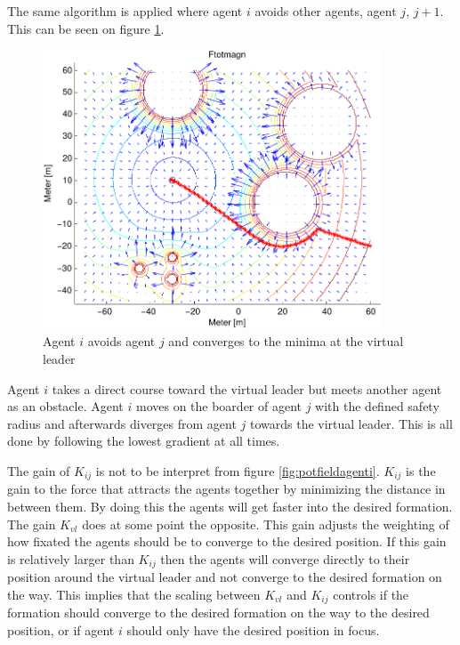 
The same algorithm is applied where agent $i$ avoids other agents, agent $j$, $j+1$. This can be seen on figure \ref{fig:avoidagent}.

\begin{figure}[htbp]
  \includegraphics[width=0.9\textwidth]{fig/ftotmagnfigpdf}
  \caption{Agent $i$ avoids agent $j$ and converges to the minima at the virtual leader}
  \label{fig:avoidagent}
\end{figure}

Agent $i$ takes a direct course toward the virtual leader but meets
another agent as an obstacle. Agent $i$ moves on the boarder of agent
$j$ with the defined safety radius and afterwards diverges from agent
$j$ towards the virtual leader. This is all done by following the
lowest gradient at all times.

The gain of $K_{ij}$ is not to be interpret from figure
\ref{fig:potfieldagenti}. $K_{ij}$ is the gain to the force that
attracts the agents together by minimizing the distance in between
them. By doing this the agents will get faster into the desired
formation. The gain $K_{vl}$ does at some point the opposite. This
gain adjusts the weighting of how fixated the agents should be to
converge to the desired position. If this gain is relatively larger
than $K_{ij}$ then the agents will converge directly to their position
around the virtual leader and not converge to the desired formation on
the way. This implies that the scaling between $K_{vl}$ and $K_{ij}$
controls if the formation should converge to the desired formation on
the way to the desired position, or if agent $i$ should only have the
desired position in focus.

